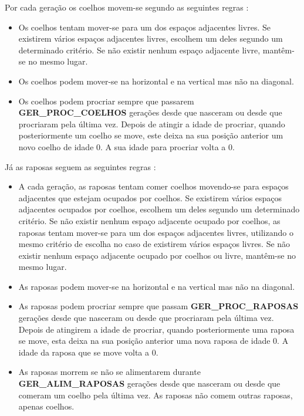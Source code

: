 \documentclass[12pt]{article}
\begin{document}
Por cada geração os coelhos movem-se segundo as seguintes regras \cite{enunciado}:

\begin{itemize}
  \item Os coelhos tentam mover-se para um dos espaços adjacentes livres. Se existirem vários espaços adjacentes livres, escolhem um deles segundo um determinado critério. Se não existir nenhum espaço adjacente livre, mantêm-se no mesmo lugar.
  \item Os coelhos podem mover-se na horizontal e na vertical mas não na diagonal.
  \item Os coelhos podem procriar sempre que passarem \textbf{GER\_PROC\_COELHOS} gerações desde que nasceram ou desde que procriaram pela última vez. Depois de atingir a idade de procriar, quando posteriormente um coelho se move, este deixa na sua posição anterior um novo coelho de idade 0. A sua idade para procriar volta a 0.
\end{itemize}

Já as raposas seguem as seguintes regras \cite{enunciado}:

\begin{itemize}
  \item A cada geração, as raposas tentam comer coelhos movendo-se para espaços adjacentes que estejam ocupados por coelhos. Se existirem vários espaços adjacentes ocupados por coelhos, escolhem um deles segundo um determinado critério. Se não existir nenhum espaço adjacente ocupado por coelhos, as raposas tentam mover-se para um dos espaços adjacentes livres, utilizando o mesmo critério de escolha no caso de existirem vários espaços livres. Se não existir nenhum espaço adjacente ocupado por coelhos ou livre, mantêm-se no mesmo lugar.
  \item As raposas podem mover-se na horizontal e na vertical mas não na diagonal.
  \item As raposas podem procriar sempre que passam \textbf{GER\_PROC\_RAPOSAS} gerações desde que nasceram ou desde que procriaram pela última vez. Depois de atingirem a idade de procriar, quando posteriormente uma raposa se move, esta deixa na sua posição anterior uma nova raposa de idade 0. A idade da raposa que se move volta a 0.
  \item As raposas morrem se não se alimentarem durante \textbf{GER\_ALIM\_RAPOSAS} gerações desde que nasceram ou desde que comeram um coelho pela última vez. As raposas não comem outras raposas, apenas coelhos.
\end{itemize}
\end{document}

